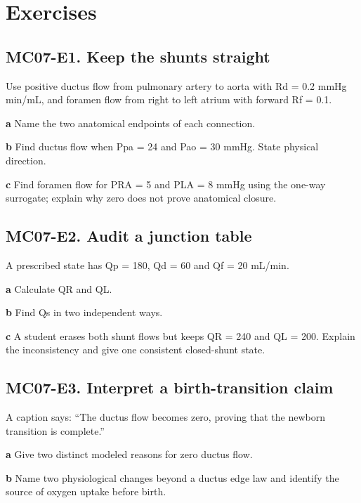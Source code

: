 \documentclass[11pt,letterpaper]{article}
\theoremstyle{definition}\newtheorem{definition}{Definition}\newtheorem{example}{Example}
\numberwithin{equation}{section}
\begin{document}
\section*{Exercises}
\par\noindent\begin{minipage}{\linewidth}
\subsection*{MC07-E1. Keep the shunts straight}
Use positive ductus flow from pulmonary artery to aorta with Rd =\allowbreak{} 0.2 mmHg min/mL, and foramen flow from right to left atrium with forward Rf =\allowbreak{} 0.1.

\textbf{a} Name the two anatomical endpoints of each connection.

\end{minipage}\par\medskip
\textbf{b} Find ductus flow when Ppa =\allowbreak{} 24 and Pao =\allowbreak{} 30 mmHg. State physical direction.

\textbf{c} Find foramen flow for PRA =\allowbreak{} 5 and PLA =\allowbreak{} 8 mmHg using the one-way surrogate; explain why zero does not prove anatomical closure.

\par\noindent\begin{minipage}{\linewidth}
\subsection*{MC07-E2. Audit a junction table}
A prescribed state has Qp =\allowbreak{} 180, Qd =\allowbreak{} 60 and Qf =\allowbreak{} 20 mL/min.

\textbf{a} Calculate QR and QL.

\end{minipage}\par\medskip
\textbf{b} Find Qs in two independent ways.

\textbf{c} A student erases both shunt flows but keeps QR =\allowbreak{} 240 and QL =\allowbreak{} 200. Explain the inconsistency and give one consistent closed-shunt state.

\par\noindent\begin{minipage}{\linewidth}
\subsection*{MC07-E3. Interpret a birth-transition claim}
A caption says: ``The ductus flow becomes zero, proving that the newborn transition is complete.''

\textbf{a} Give two distinct modeled reasons for zero ductus flow.

\end{minipage}\par\medskip
\textbf{b} Name two physiological changes beyond a ductus edge law and identify the source of oxygen uptake before birth.
\end{document}
